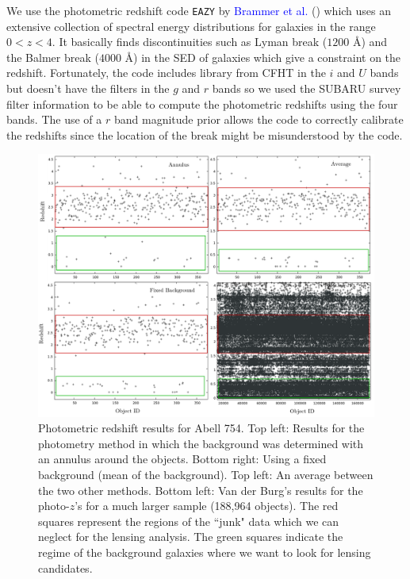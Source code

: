 We use the photometric redshift code \texttt{EAZY}  by \textcolor{blue}{Brammer et al.} (\citeyear{Reference22}) which uses an extensive collection of spectral energy distributions for galaxies in the range $0<z<4$. It basically finds discontinuities such as Lyman break ($1200$ \AA) and the Balmer break ($4000$ \AA) in the SED of galaxies which give a constraint on the redshift. Fortunately, the code includes library from CFHT in the $i$ and $U$ bands but doesn't have the filters in the $g$ and $r$ bands so we used the SUBARU survey filter information to be able to compute the photometric redshifts using the four bands. The use of a $r$ band magnitude prior allows the code to correctly calibrate the redshifts since the location of the break might be misunderstood by the code. 

\begin{figure}[H]
\centering
\includegraphics[width=14cm]{images/photo_z_red_squares.png}
\caption[Photometric redshift results for Abell 754]{Photometric redshift results for Abell 754. Top left: Results for the photometry method in which the background was determined with an annulus around the objects. Bottom right: Using a fixed background (mean of the background). Top left: An average between the two other methods. Bottom left: Van der Burg's results for the photo-$z$'s for a much larger sample (188,964 objects). The red squares represent the regions of the ``junk" data which we can neglect for the lensing analysis. The green squares indicate the regime of the background galaxies where we want to look for lensing candidates.}
\end{figure}


